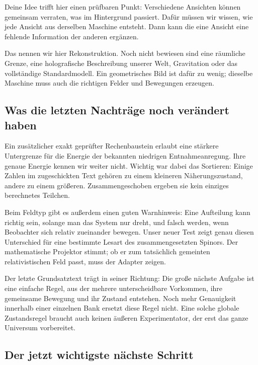 \documentclass[
  ngerman,
  10pt,
  a4paper,
]{article}
\begin{document}
Deine Idee trifft hier einen prüfbaren Punkt: Verschiedene Ansichten
können gemeinsam verraten, was im Hintergrund passiert. Dafür müssen wir
wissen, wie jede Ansicht aus derselben Maschine entsteht. Dann kann die
eine Ansicht eine fehlende Information der anderen ergänzen.

Das nennen wir hier Rekonstruktion. Noch nicht bewiesen sind eine
räumliche Grenze, eine holografische Beschreibung unserer Welt,
Gravitation oder das vollständige Standardmodell. Ein geometrisches Bild
ist dafür zu wenig; dieselbe Maschine muss auch die richtigen Felder und
Bewegungen erzeugen.

\subsection{Was die letzten Nachträge noch verändert
haben}\label{was-die-letzten-nachtruxe4ge-noch-veruxe4ndert-haben}

Ein zusätzlicher exakt geprüfter Rechenbaustein erlaubt eine stärkere
Untergrenze für die Energie der bekannten niedrigen Entnahmeanregung.
Ihre genaue Energie kennen wir weiter nicht. Wichtig war dabei das
Sortieren: Einige Zahlen im zugeschickten Text gehören zu einem
kleineren Näherungszustand, andere zu einem größeren. Zusammengeschoben
ergeben sie kein einziges berechnetes Teilchen.

Beim Feldtyp gibt es außerdem einen guten Warnhinweis: Eine Aufteilung
kann richtig sein, solange man das System nur dreht, und falsch werden,
wenn Beobachter sich relativ zueinander bewegen. Unser neuer Test zeigt
genau diesen Unterschied für eine bestimmte Lesart des zusammengesetzten
Spinors. Der mathematische Projektor stimmt; ob er zum tatsächlich
gemeinten relativistischen Feld passt, muss der Adapter zeigen.

Der letzte Grundsatztext trägt in seiner Richtung: Die große nächste
Aufgabe ist eine einfache Regel, aus der mehrere unterscheidbare
Vorkommen, ihre gemeinsame Bewegung und ihr Zustand entstehen. Noch mehr
Genauigkeit innerhalb einer einzelnen Bank ersetzt diese Regel nicht.
Eine solche globale Zustandsregel braucht auch keinen äußeren
Experimentator, der erst das ganze Universum vorbereitet.

\subsection{Der jetzt wichtigste nächste
Schritt}\label{der-jetzt-wichtigste-nuxe4chste-schritt}
\end{document}

